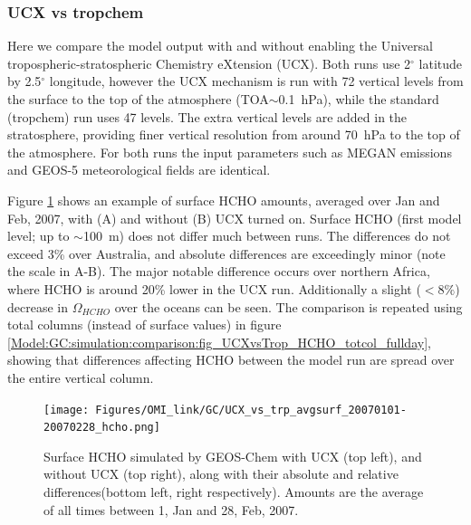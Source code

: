     \subsubsection{UCX vs tropchem}
      \label{Model:GC:simulation:comparison}
      
      Here we compare the model output with and without enabling the Universal tropospheric-stratospheric Chemistry eXtension (UCX).
      Both runs use 2$^{\circ}$ latitude by 2.5$^{\circ}$ longitude, however the UCX mechanism is run with 72 vertical levels from the surface to the top of the atmosphere (TOA$\sim$0.1~hPa), while the standard (tropchem) run uses 47 levels.
      The extra vertical levels are added in the stratosphere, providing finer vertical resolution from around 70~hPa to the top of the atmosphere.
      For both runs the input parameters such as MEGAN emissions and GEOS-5 meteorological fields are identical.
      
      Figure \ref{Model:GC:simulation:comparison:fig_UCXvsTrop_HCHO_surf_fullday} shows an example of surface HCHO amounts, averaged over Jan and Feb, 2007, with (A) and without (B) UCX turned on.
      Surface HCHO (first model level; up to $\sim$100~m) does not differ much between runs.
      The differences do not exceed 3\% over Australia, and absolute differences are exceedingly minor (note the scale in A-B).
      The major notable difference occurs over northern Africa, where HCHO is around 20\% lower in the UCX run.
      Additionally a slight ($<8\%$) decrease in $\Omega_{HCHO}$ over the oceans can be seen.
      The comparison is repeated using total columns (instead of surface values) in figure \ref{Model:GC:simulation:comparison:fig_UCXvsTrop_HCHO_totcol_fullday}, showing that differences affecting HCHO between the model run are spread over the entire vertical column.
      
      
      \begin{figure}
        \texttt{[image: Figures/OMI\_link/GC/UCX\_vs\_trp\_avgsurf\_20070101-20070228\_hcho.png]}
        \caption{%
          Surface HCHO simulated by GEOS-Chem with UCX (top left), and without UCX (top right), along with their absolute and relative differences(bottom left, right respectively).
          Amounts are the average of all times between 1, Jan and 28, Feb, 2007.
        }
        \label{Model:GC:simulation:comparison:fig_UCXvsTrop_HCHO_surf_fullday}
      \end{figure}
      
